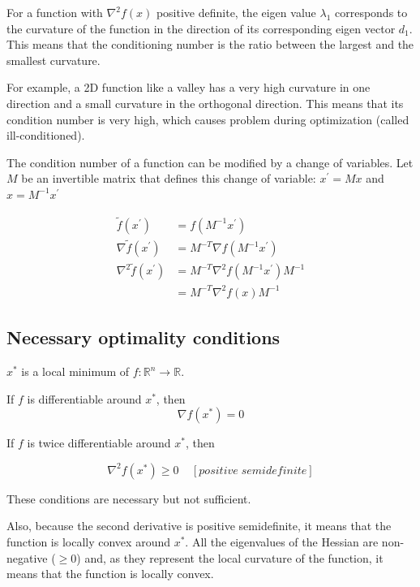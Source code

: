 For a function with $\nabla^2 f(x)$ positive definite, the eigen value $\lambda_1$ corresponds to the curvature of the function in the direction of its corresponding eigen vector $d_1$. This means that the conditioning number is the ratio between the largest and the smallest curvature.

For example, a 2D function like a valley has a very high curvature in one direction and a small curvature in the orthogonal direction. This means that its condition number is very high, which causes problem during optimization (called ill-conditioned).

The condition number of a function can be modified by a change of variables. Let $M$ be an invertible matrix that defines this change of variable: $x^{\prime}=Mx$ and $x=M^{-1}x^{\prime}$

\begin{equation}
    \begin{split}
        \tilde{f}(x^{\prime}) & = f(M^{-1}x^{\prime}) \\
        \nabla\tilde{f}(x^{\prime}) & = M^{-T}\nabla f(M^{-1}x^{\prime}) \\
        \nabla^2\tilde{f}(x^{\prime}) & = M^{-T}\nabla^2 f(M^{-1}x^{\prime})M^{-1} \\
        & = M^{-T}\nabla^2 f(x)M^{-1}
    \end{split}
\end{equation}


\subsection{Necessary optimality conditions}

$x^*$ is a local minimum of $f:\mathbb{R}^n \rightarrow\mathbb{R}$.

If $f$ is differentiable around $x^*$, then
\begin{equation}
    \nabla f(x^*)=0
\end{equation}

If $f$ is twice differentiable around $x^*$, then

\begin{equation}
    \nabla^2f(x^*) \geq 0 \;\;\;\; [positive\;semidefinite]
\end{equation}

These conditions are necessary but not sufficient.

Also, because the second derivative is positive semidefinite, it means that the function is locally convex around $x^*$.
All the eigenvalues of the Hessian are non-negative ($\geq 0$) and, as they represent the local curvature of the function, it means that the function is locally convex.

